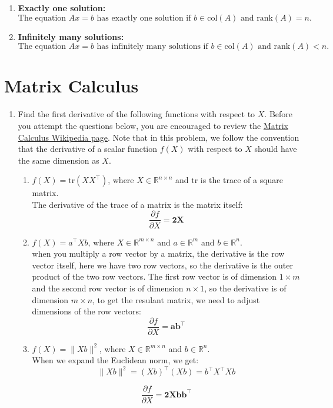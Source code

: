 \documentclass[a3paper,12pt]{extarticle} %
\begin{document}
\begin{enumerate}
\begin{enumerate}
        \item \textbf{Exactly one solution:}
        \[
        \text{The equation } Ax = b \text{ has exactly one solution if } b \in \text{col}(A) \text{ and } \text{rank}(A) = n.
        \]
        
        \item \textbf{Infinitely many solutions:}
        \[
        \text{The equation } Ax = b \text{ has infinitely many solutions if } b \in \text{col}(A) \text{ and } \text{rank}(A) < n. 
        \]
    \end{enumerate}
\end{enumerate}
\newpage
\section{Matrix Calculus}
\begin{enumerate}
    \item Find the first derivative of the following functions with respect to \( X \). Before you attempt the questions below, you are encouraged to review the  \href{https://en.wikipedia.org/wiki/Matrix_calculus}{Matrix Calculus Wikipedia page}. Note that in this problem, we follow the convention that the derivative of a scalar function \( f(X) \) with respect to \( X \) should have the same dimension as \( X \).
    \begin{enumerate}
        \item \( f(X) = \text{tr}(XX^\top) \), where \( X \in \mathbb{R}^{n \times n} \) and \(\text{tr}\) is the trace of a square matrix.
        \\ The derivative of the trace of a matrix is the matrix itself:
        \[
        \frac{\partial f}{\partial X} = \mathbf{2X}
        \]

        \item \( f(X) = a^\top X b \), where \( X \in \mathbb{R}^{m \times n} \) and \( a \in \mathbb{R}^m \) and \( b \in \mathbb{R}^n \).
        \\ when you multiply a row vector by a matrix, the derivative is the row vector itself, here we have two row vectors, so the derivative is the outer product of the two row vectors. The first row vector is of dimension \(1 \times m\) and the second row vector is of dimension \(n \times 1\), so the derivative is of dimension \(m \times n\), to get the resulant matrix, we need to adjust dimensions of the row vectors:
        \[
        \frac{\partial f}{\partial X} = \mathbf{ab^\top}
        \]
        \item \( f(X) = \|Xb\|^2 \), where \( X \in \mathbb{R}^{m \times n} \) and \( b \in \mathbb{R}^n \).
        \\ When we expand the Euclidean norm, we get:
        \[
        \|Xb\|^2 = (Xb)^\top (Xb) = b^\top X^\top X b
        \]
    
        \[
        \frac{\partial f}{\partial X} = \mathbf{2Xbb^\top}
        \]
    \end{enumerate}
\end{enumerate}
\newpage
\end{document}
